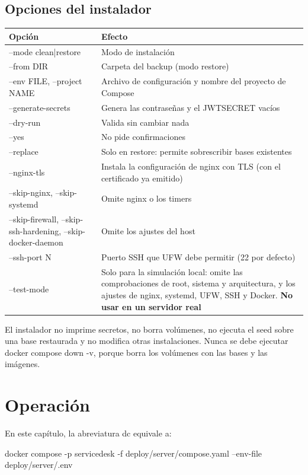 \documentclass[11pt,a4paper,oneside]{report}
\newcommand{\codus}{\textunderscore\allowbreak}
\DeclareRobustCommand{\cod}[1]{{\small\ttfamily\let\_\codus #1}}
\newcommand{\cabecera}{\rowcolor{utaRojo!12}}
\begin{document}
\section{Opciones del instalador}
\begin{longtable}{@{}P{4.6cm}p{10.0cm}@{}}
\toprule
\cabecera \textbf{Opción} & \textbf{Efecto} \\
\midrule
\endhead
\cod{--mode clean|restore} & Modo de instalación \\
\cod{--from DIR} & Carpeta del backup (modo restore) \\
\cod{--env FILE}, \cod{--project NAME} & Archivo de configuración y nombre del proyecto de Compose \\
\cod{--generate-secrets} & Genera las contraseñas y el \cod{JWT\_SECRET} vacíos \\
\cod{--dry-run} & Valida sin cambiar nada \\
\cod{--yes} & No pide confirmaciones \\
\cod{--replace} & Solo en restore: permite sobrescribir bases existentes \\
\cod{--nginx-tls} & Instala la configuración de nginx con TLS (con el certificado ya emitido) \\
\cod{--skip-nginx}, \cod{--skip-systemd} & Omite nginx o los timers \\
\cod{--skip-firewall}, \cod{--skip-ssh-hardening}, \cod{--skip-docker-daemon} & Omite los ajustes del host \\
\cod{--ssh-port N} & Puerto SSH que UFW debe permitir (22 por defecto) \\
\cod{--test-mode} & Solo para la simulación local: omite las comprobaciones de root, sistema y arquitectura, y los ajustes de nginx, systemd, UFW, SSH y Docker. \textbf{No usar en un servidor real} \\
\bottomrule
\end{longtable}

El instalador no imprime secretos, no borra volúmenes, no ejecuta el seed sobre una base
restaurada y no modifica otras instalaciones. Nunca se debe ejecutar \cod{docker compose down -v},
porque borra los volúmenes con las bases y las imágenes.

\chapter{Operación}\label{cap:operacion}

En este capítulo, la abreviatura \cod{dc} equivale a:
\begin{bash}
docker compose -p servicedesk -f deploy/server/compose.yaml --env-file deploy/server/.env
\end{bash}
\end{document}
